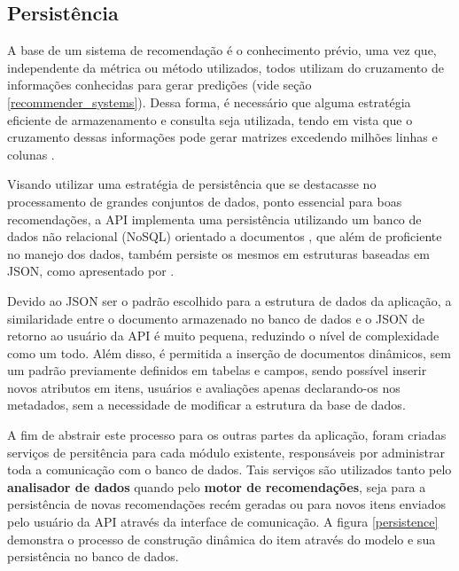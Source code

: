 \documentclass[12pt, openright, oneside, a4paper, brazil]{abntex2}
\begin{document}
\subsection{Persistência} \label{analisador:persistencia}

A base de um sistema de recomendação é o conhecimento prévio, uma vez que, independente da métrica ou método utilizados, todos utilizam do cruzamento de informações conhecidas para gerar predições (vide seção \ref{recommender_systems}). Dessa forma, é necessário que alguma estratégia eficiente de armazenamento e consulta seja utilizada, tendo em vista que o cruzamento dessas informações pode gerar matrizes excedendo milhões linhas e colunas \cite{gomez2016netflix}.

Visando utilizar uma estratégia de persistência que se destacasse no processamento de grandes conjuntos de dados, ponto essencial para boas recomendações, a API implementa uma persistência utilizando um banco de dados não relacional (NoSQL) orientado a documentos \cite{leavitt2010will}, que além de proficiente no manejo dos dados, também persiste os mesmos em estruturas baseadas em JSON, como apresentado por .

Devido ao JSON ser o padrão escolhido para a estrutura de dados da aplicação, a similaridade entre o documento armazenado no banco de dados e o JSON de retorno ao usuário da API é muito pequena, reduzindo o nível de complexidade como um todo. Além disso, é permitida a inserção de documentos dinâmicos, sem um padrão previamente definidos em tabelas e campos, sendo possível inserir novos atributos em itens, usuários e avaliações apenas declarando-os nos metadados, sem a necessidade de modificar a estrutura da base de dados.

A fim de abstrair este processo para os outras partes da aplicação, foram criadas serviços de persitência para cada módulo existente, responsáveis por administrar toda a comunicação com o banco de dados. Tais serviços são utilizados tanto pelo \textbf{analisador de dados} quando pelo \textbf{motor de recomendações}, seja para a persistência de novas recomendações recém geradas ou para novos itens enviados pelo usuário da API através da interface de comunicação. A figura \ref{persistence} demonstra o processo de construção dinâmica do item através do modelo e sua persistência no banco de dados.	
\end{document}
